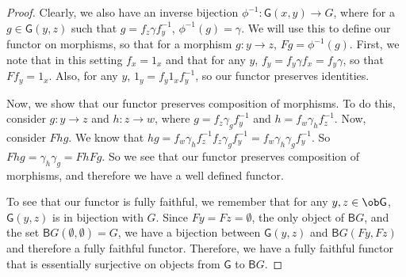 \documentclass[main.tex]{subfiles}
\begin{document}
\begin{proof}
	Clearly, we also have an inverse bijection $\phi^{-1}\colon \textsf{G}(x,y)
	\rightarrow G$, where for a $g \in \textsf{G}(y,z)$ such that $g = f_z\gamma
	f_y^{-1}$, $\phi^{-1}(g) = \gamma$. We will use this to define our functor
	on morphisms, so that for a morphism $g\colon y\rightarrow z$, $Fg =
	\phi^{-1}(g)$. First, we note that in this setting $f_x = 1_x$ and that for
	any $y$, $f_y = f_y\gamma f_x = f_y\gamma$, so that $Ff_y = 1_x$. Also, for
	any $y$, $1_y = f_y 1_x f_y^{-1}$, so our functor preserves identities.

	Now, we show that our functor preserves composition of morphisms. To do
	this, consider $g\colon y\rightarrow z$ and $h\colon z \rightarrow w$, where $g =
	f_z\gamma_gf_y^{-1}$ and $h = f_w\gamma_hf_z^{-1}$. Now, consider $Fhg$. We
	know that $hg = f_w\gamma_hf_z^{-1}f_z\gamma_gf_y^{-1} =
	f_w\gamma_h\gamma_gf_y^{-1}$. So $Fhg = \gamma_h\gamma_g = FhFg$. So we see
	that our functor preserves composition of morphisms, and therefore we have a
	well defined functor.

	To see that our functor is fully faithful, we remember that for any $y,z \in
	\ob\textsf{G}$, $\textsf{G}(y,z)$ is in bijection with $G$. Since $Fy = Fz =
	\emptyset$, the only object of $\textsf{B}G$, and the set
	$\textsf{B}G(\emptyset, \emptyset) = G$, we have a bijection between
	$\textsf{G}(y,z)$ and $\textsf{B}G(Fy, Fz)$ and therefore a fully faithful
	functor. Therefore, we have a fully faithful functor that is essentially
	surjective on objects from $\textsf{G}$ to $\textsf{B}G$.


\end{proof}
\end{document}
